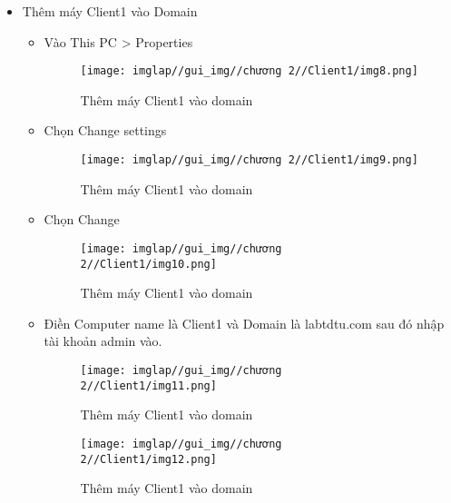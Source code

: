 \documentclass[13pt]{article}
\begin{document}
                \begin{itemize}
                    \item Thêm máy Client1 vào Domain
                        \begin{itemize}
                        \item Vào This PC > Properties
                        \begin{figure}[H]
                            \centering
                            \texttt{[image: imglap//gui\_img//chương 2//Client1/img8.png]}
                            \caption{Thêm máy Client1 vào domain}
                            \label{fig:enter-label}
                        \end{figure}
\newpage
                        \item Chọn Change settings
                        \begin{figure}[H]
                            \centering
                            \texttt{[image: imglap//gui\_img//chương 2//Client1/img9.png]}
                            \caption{Thêm máy Client1 vào domain}
                            \label{fig:enter-label}
                        \end{figure}
\newpage
                        \item Chọn Change
                        \begin{figure}[H]
                            \centering
                            \texttt{[image: imglap//gui\_img//chương 2//Client1/img10.png]}
                            \caption{Thêm máy Client1 vào domain}
                            \label{fig:enter-label}
                        \end{figure}

                        \item Điền Computer name là Client1 và Domain là labtdtu.com sau đó nhập tài khoản admin vào.
                        \begin{figure}[H]
                            \centering
                            \begin{minipage}{0.45\linewidth}
                                \centering
                                \texttt{[image: imglap//gui\_img//chương 2//Client1/img11.png]}
                                \caption{Thêm máy Client1 vào domain}
                                \label{fig:enter-label1}
                            \end{minipage}
                            \hfill
                            \begin{minipage}{0.45\linewidth}
                                \centering
                                \texttt{[image: imglap//gui\_img//chương 2//Client1/img12.png]}
                                \caption{Thêm máy Client1 vào domain}
                                \label{fig:enter-label2}
                            \end{minipage}
                        \end{figure}
                        

\end{itemize}
\end{itemize}
\end{document}
